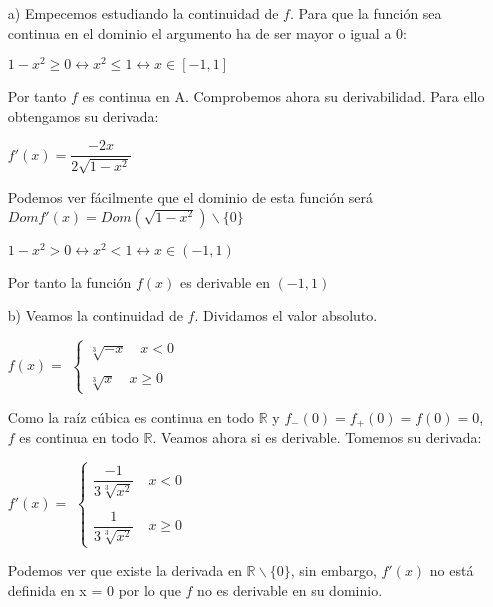 \documentclass[12pt,a4paper]{article}
\begin{document}
\begin{enumerate}
	\item[a)] Empecemos estudiando la continuidad de $f$. Para que la función sea continua en el dominio el argumento ha de ser mayor o igual a 0: \\
	\begin{center}
		$1-x^{2} \geq 0 \leftrightarrow x^{2} \leq 1 \leftrightarrow x \in [-1,1]$
	\end{center}
	Por tanto $f$ es continua en A. Comprobemos ahora su derivabilidad. Para ello obtengamos su derivada:
	\begin{center}
		$f'(x)=\dfrac{-2x}{2\sqrt{1-x^{2}}}$
	\end{center}
	Podemos ver fácilmente que el dominio de esta función será
	$Domf'(x) = Dom(\sqrt{1-x^{2}}) \backslash \{0\}$
	\begin{center}
		$1-x^{2} > 0 \leftrightarrow x^{2} < 1 \leftrightarrow x \in (-1,1)$
	\end{center}
	Por tanto la función $f(x)$ es derivable en $(-1, 1)$
	
	\item[b)] Veamos la continuidad de $f$. Dividamos el valor absoluto.
	
	\begin{center}
		$f(x) = $ 
		$\left\lbrace
		\begin{array}{rcl}
			\sqrt[3]{-x} \quad  x < 0
		\\
		\\  \sqrt[3]{x} \quad x \geq 0
		\end{array}
		\right.$ \\ 
	\end{center}
	Como la raíz cúbica es continua en todo $\mathbb{R}$ y $f_-(0) = f_+(0) = f(0) = 0$, $f$ es continua en todo $\mathbb{R}$. Veamos ahora si es derivable. Tomemos su derivada:
	
	\begin{center}
		$f'(x) = $ 
		$\left\lbrace
		\begin{array}{rcl}
		   \dfrac{-1}{3\sqrt[3]{x^{2}}} \quad  x < 0
		\\
		\\ \dfrac{1}{3\sqrt[3]{x^{2}}} \quad x \geq 0
		\end{array}
		\right.$
	\end{center}
	Podemos ver que existe la derivada en $\mathbb{R} \backslash \{0\}$, sin embargo, $f'(x)$ no está definida en x = 0 por lo que $f$ no es derivable en su dominio.
 
\end{enumerate}
	
\end{document}
